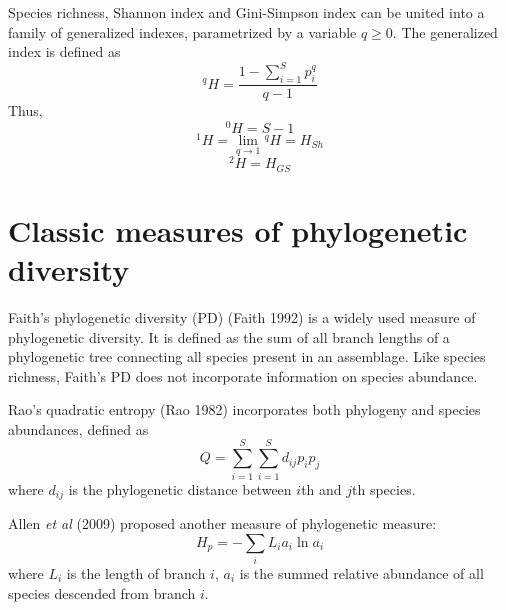 \documentclass[11pt]{article}
\begin{document}
\newline

Species richness, Shannon index and Gini-Simpson index can be united into a family of generalized indexes, parametrized by a variable $q \ge 0$. 
The generalized index is defined as 
\begin{equation}
    ^{q}H = \frac{1-\sum\limits_{i=1}^{S} p_i^q}{q-1}
    \label{GeneralizedIndex}
\end{equation}
Thus,
\begin{equation}
    ^{0}H = S-1
\end{equation}
\begin{equation}
    ^{1}H = \lim\limits_{q\rightarrow 1}{^{q}H} = H_{Sh}
\end{equation}
\begin{equation}
    ^{2}H = H_{GS}
\end{equation}

\section{Classic measures of phylogenetic diversity}
\label{FaithPD}
Faith's phylogenetic diversity (PD) (Faith 1992) is a widely used measure of phylogenetic diversity. 
It is defined as the sum of all branch lengths of a phylogenetic tree connecting all species present in an assemblage. 
Like species richness, Faith's PD does not incorporate information on species abundance.

\newline

Rao's quadratic entropy (Rao 1982) incorporates both phylogeny and species abundances, defined as 
\begin{equation}
    Q = \sum\limits_{i=1}^{S}\sum\limits_{i=1}^{S} d_{ij}p_{i}p_{j}
    \label{RaoPD}
\end{equation}
where $d_{ij}$ is the phylogenetic distance between $i$th and $j$th species. 

\newline

Allen \textit{et al} (2009) proposed another measure of phylogenetic measure: 
\begin{equation}
    H_p = -\sum\limits_{i} L_ia_i \ln a_i
    \label{AllenPD}
\end{equation}
where $L_i$ is the length of branch $i$, $a_i$ is the summed relative abundance of all species descended from branch $i$.

\newline
\end{document}

